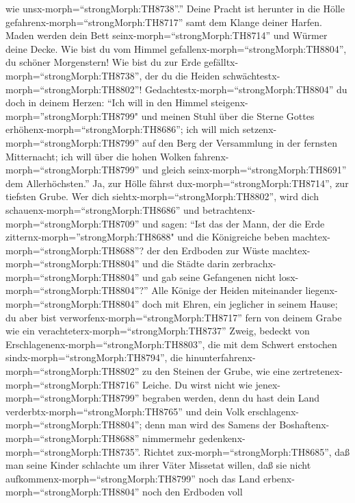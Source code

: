 wie unsx-morph=``strongMorph:TH8738''.''  Deine Pracht ist
herunter in die Hölle gefahrenx-morph=``strongMorph:TH8717'' samt dem
Klange deiner Harfen. Maden werden dein Bett
seinx-morph=``strongMorph:TH8714'' und Würmer deine Decke. 
Wie bist du vom Himmel gefallenx-morph=``strongMorph:TH8804'', du
schöner Morgenstern! Wie bist du zur Erde
gefälltx-morph=``strongMorph:TH8738'', der du die Heiden
schwächtestx-morph=``strongMorph:TH8802''! 
Gedachtestx-morph=``strongMorph:TH8804'' du doch in deinem Herzen: ``Ich
will in den Himmel steigenx-morph=''strongMorph:TH8799" und meinen Stuhl
über die Sterne Gottes erhöhenx-morph=``strongMorph:TH8686'';
 ich will mich setzenx-morph=``strongMorph:TH8799'' auf den
Berg der Versammlung in der fernsten Mitternacht; ich will über die
hohen Wolken fahrenx-morph=``strongMorph:TH8799'' und gleich
seinx-morph=``strongMorph:TH8691'' dem Allerhöchsten.'' 
Ja, zur Hölle fährst dux-morph=``strongMorph:TH8714'', zur tiefsten
Grube.  Wer dich siehtx-morph=``strongMorph:TH8802'', wird
dich schauenx-morph=``strongMorph:TH8686'' und
betrachtenx-morph=``strongMorph:TH8709'' und sagen: ``Ist das der Mann,
der die Erde zitternx-morph=''strongMorph:TH8688" und die Königreiche
beben machtex-morph=``strongMorph:TH8688''?  der den
Erdboden zur Wüste machtex-morph=``strongMorph:TH8804'' und die Städte
darin zerbrachx-morph=``strongMorph:TH8804'' und gab seine Gefangenen
nicht losx-morph=``strongMorph:TH8804''?''  Alle Könige der
Heiden miteinander liegenx-morph=``strongMorph:TH8804'' doch mit Ehren,
ein jeglicher in seinem Hause;  du aber bist
verworfenx-morph=``strongMorph:TH8717'' fern von deinem Grabe wie ein
verachteterx-morph=``strongMorph:TH8737'' Zweig, bedeckt von
Erschlagenenx-morph=``strongMorph:TH8803'', die mit dem Schwert
erstochen sindx-morph=``strongMorph:TH8794'', die
hinunterfahrenx-morph=``strongMorph:TH8802'' zu den Steinen der Grube,
wie eine zertretenex-morph=``strongMorph:TH8716'' Leiche. 
Du wirst nicht wie jenex-morph=``strongMorph:TH8799'' begraben werden,
denn du hast dein Land verderbtx-morph=``strongMorph:TH8765'' und dein
Volk erschlagenx-morph=``strongMorph:TH8804''; denn man wird des Samens
der Boshaftenx-morph=``strongMorph:TH8688'' nimmermehr
gedenkenx-morph=``strongMorph:TH8735''.  Richtet
zux-morph=``strongMorph:TH8685'', daß man seine Kinder schlachte um
ihrer Väter Missetat willen, daß sie nicht
aufkommenx-morph=``strongMorph:TH8799'' noch das Land
erbenx-morph=``strongMorph:TH8804'' noch den Erdboden voll
